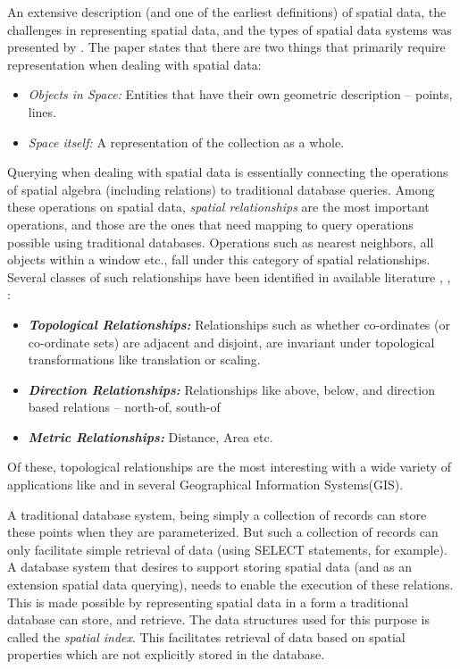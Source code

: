 \documentclass{sig-alternate-05-2015}
\begin{document}
An extensive description (and one of the earliest definitions) of spatial data, the challenges in representing spatial data, and the types of spatial data systems was presented by \cite{guting1994introduction}. The paper states that there are two things that primarily require representation when dealing with spatial data:
\begin{itemize}
\item \textit{Objects in Space:} Entities that have their own geometric description -- points, lines.
\item \textit{Space itself:} A representation of the collection as a whole. 
\end{itemize}

Querying when dealing with spatial data is essentially connecting the operations of spatial algebra (including relations) to traditional database queries. Among these operations on spatial data, \textit{spatial relationships} are the most important operations, and those are the ones that need mapping to query operations possible using traditional databases. Operations such as nearest neighbors, all objects within a window etc., fall under this category of spatial relationships. Several classes of such relationships have been identified in available literature \cite{pullar1988toward}, \cite{egenhofer1989formal}, \cite{worboys1992generic}:

\begin{itemize}
\item \textbf{\textit{Topological Relationships:}} Relationships such as whether co-ordinates (or co-ordinate sets) are adjacent and disjoint, are invariant under topological transformations like translation or scaling.
\item \textbf{\textit{Direction Relationships:}} Relationships like above, below, and direction based relations -- north-of, south-of
\item \textbf{\textit{Metric Relationships:}} Distance, Area etc.
\end{itemize}

Of these, topological relationships are the most interesting with a wide variety of applications like \cite{egenhofer1991point} and in several Geographical Information Systems(GIS). 

A traditional database system, being simply a collection of records can store these points when they are parameterized. But such a collection of records can only facilitate simple retrieval of data (using SELECT statements, for example). A database system that desires to support storing spatial data (and as an extension spatial data querying), needs to enable the execution of these relations. This is made possible by representing spatial data in a form a traditional database can store, and retrieve. The data structures used for this purpose is called the \textit{spatial index}. This facilitates retrieval of data based on spatial properties which are not explicitly stored in the database. 
\end{document}
